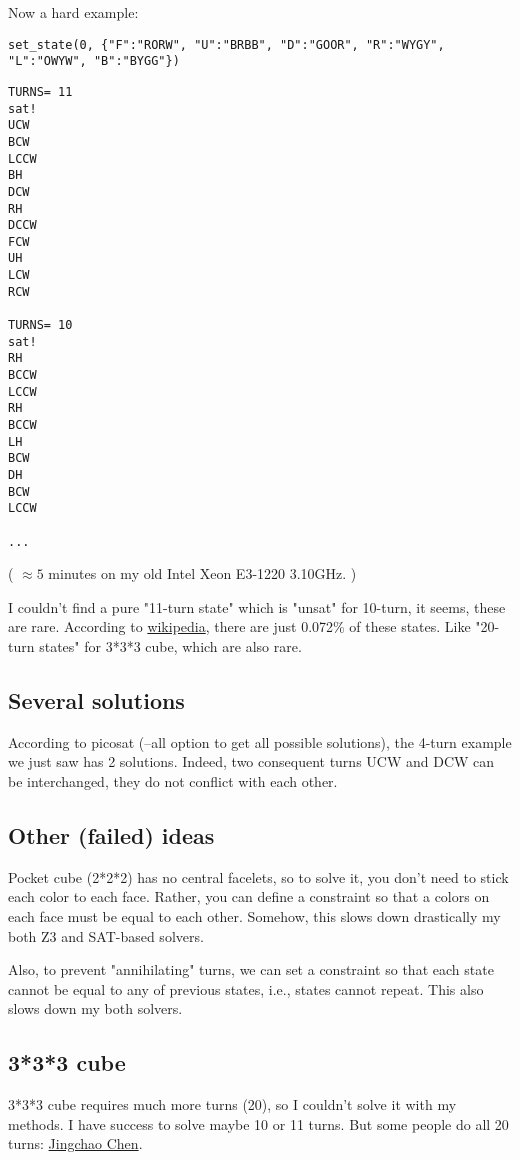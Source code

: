 Now a hard example:

\begin{lstlisting}
set_state(0, {"F":"RORW", "U":"BRBB", "D":"GOOR", "R":"WYGY", "L":"OWYW", "B":"BYGG"})
\end{lstlisting}

\begin{lstlisting}
TURNS= 11
sat!
UCW
BCW
LCCW
BH
DCW
RH
DCCW
FCW
UH
LCW
RCW

TURNS= 10
sat!
RH
BCCW
LCCW
RH
BCCW
LH
BCW
DH
BCW
LCCW

...
\end{lstlisting}

( $\approx 5$ minutes on my old Intel Xeon E3-1220 3.10GHz. )

I couldn't find a pure "11-turn state" which is "unsat" for 10-turn, it seems, these are rare.
According to \href{https://en.wikipedia.org/wiki/Pocket_Cube}{wikipedia}, there are just 0.072\% of these states.
Like "20-turn states" for 3*3*3 cube, which are also rare.

\subsection{Several solutions}

According to picosat (--all option to get all possible solutions), the 4-turn example we just saw has 2 solutions.
Indeed, two consequent turns UCW and DCW can be interchanged, they do not conflict with each other.

\subsection{Other (failed) ideas}

Pocket cube (2*2*2) has no central facelets, so to solve it, you don't need to stick each color to each face.
Rather, you can define a constraint so that a colors on each face must be equal to each other.
Somehow, this slows down drastically my both Z3 and SAT-based solvers.

Also, to prevent "annihilating" turns, we can set a constraint so that each state cannot be equal to any of previous
states, i.e., states cannot repeat.
This also slows down my both solvers.

\subsection{3*3*3 cube}

3*3*3 cube requires much more turns (20), so I couldn't solve it with my methods.
I have success to solve maybe 10 or 11 turns.
But some people do all 20 turns: \href{https://arxiv.org/pdf/1105.1436.pdf}{Jingchao Chen}.

